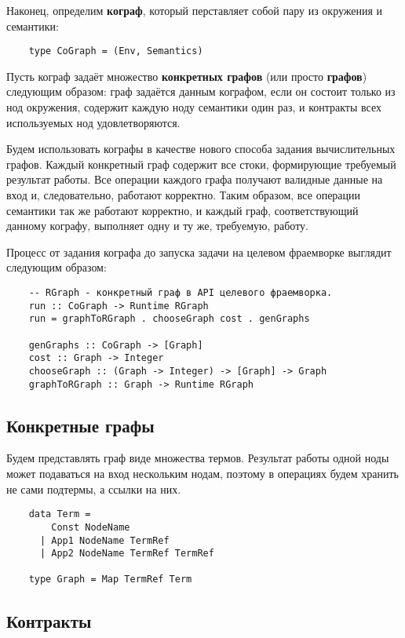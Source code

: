 Наконец, определим \textbf{кограф}, который перставляет собой пару из окружения и семантики:
\begin{lstlisting}
    type CoGraph = (Env, Semantics)
\end{lstlisting}

Пусть кограф задаёт множество \textbf{конкретных графов} (или просто \textbf{графов}) следующим образом:
граф задаётся данным кографом, если он состоит только из нод окружения, содержит каждую ноду семантики один раз, и контракты всех используемых нод удовлетворяются.

Будем использовать кографы в качестве нового способа задания вычислительных графов.
Каждый конкретный граф содержит все стоки, формирующие требуемый результат работы.
Все операции каждого графа получают валидные данные на вход и, следовательно, работают корректно.
Таким образом, все операции семантики так же работают корректно, и каждый граф, соответствующий данному кографу, выполняет одну и ту же, требуемую, работу.

Процесс от задания кографа до запуска задачи на целевом фраемворке выглядит следующим образом:
\begin{lstlisting}
    -- RGraph - конкретный граф в API целевого фраемворка.
    run :: CoGraph -> Runtime RGraph
    run = graphToRGraph . chooseGraph cost . genGraphs

    genGraphs :: CoGraph -> [Graph]
    cost :: Graph -> Integer
    chooseGraph :: (Graph -> Integer) -> [Graph] -> Graph
    graphToRGraph :: Graph -> Runtime RGraph
\end{lstlisting}


\subsection{Конкретные графы}

Будем представлять граф виде множества термов. Результат работы одной ноды может подаваться на вход нескольким нодам, поэтому в операциях будем хранить не сами подтермы, а ссылки на них.

\begin{lstlisting}
    data Term =
        Const NodeName
      | App1 NodeName TermRef
      | App2 NodeName TermRef TermRef

    type Graph = Map TermRef Term
\end{lstlisting}


\subsection{Контракты}

